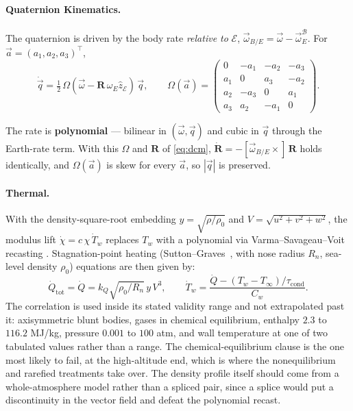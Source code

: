 \paragraph{Quaternion Kinematics.}
The quaternion is driven by the body rate \emph{relative to} $\mathcal E$,
$\vec\omega_{B/E} = \vec\omega - \vec\omega_E^{\mathcal B}$. For
$\vec a = (a_1, a_2, a_3)^\top$,
\begin{equation}
\label{eq:qkin}
\dot{\vec{q}} = \tfrac{1}{2}\,\Omega(\vec\omega
- \mathbf R\,\omega_E\hat z_{\mathcal E})\,\vec{q},
\qquad
\Omega(\vec a) = \begin{pmatrix}
0 & -a_1 & -a_2 & -a_3\\
a_1 & 0 & a_3 & -a_2 \\
a_2 & -a_3 & 0 & a_1 \\
a_3 & a_2 & -a_1 & 0
\end{pmatrix}.
\end{equation}

\begin{remark}
The rate is \textbf{polynomial} --- bilinear in $(\vec\omega, \vec q)$ and cubic
in $\vec q$ through the Earth-rate term. With this $\Omega$ and $\mathbf R$ of
\cref{eq:dcm}, $\dot{\mathbf R} = -[\vec\omega_{B/E}\times]\,\mathbf R$ holds
identically, and $\Omega(\vec a)$ is skew for every $\vec a$, so $|\vec q|$ is
preserved.
\end{remark}

\paragraph{Thermal.}
With the density-square-root embedding $y = \sqrt{\rho/\rho_0}$ and
$V = \sqrt{u^2+v^2+w^2}$, the modulus lift $\dot\chi = c\,\chi\,\dot T_w$
replaces $T_w$ with a polynomial via Varma--Savageau--Voit recasting
\parencite{savageau1987recasting}.
Stagnation-point heating (Sutton--Graves~\parencite{sutton1971general},
with nose radius $R_n$, sea-level density $\rho_0$) equations are then given by:
\begin{equation}
\label{eq:thermal}
\dot Q_{\mathrm{tot}} = \dot Q = k_Q\sqrt{\rho_0/R_n}\,y\,V^3,
\qquad
\dot T_w = \frac{\dot Q - (T_w - T_\infty)/\tau_\text{cond}}{C_w}.
\end{equation}
The correlation is used inside its stated validity range and not extrapolated
past it: axisymmetric blunt bodies, gases in chemical equilibrium, enthalpy
$2.3$ to $116.2$ MJ/kg, pressure $0.001$ to $100$ atm, and wall temperature at
one of two tabulated values rather than a range\parencite{sutton1971general,fay1958theory}.
The chemical-equilibrium clause is the one most likely to fail, at the
high-altitude end, which is where the nonequilibrium and rarefied treatments
take over\parencite{gnoffo1999planetary}.
The density profile itself should come from a whole-atmosphere model rather than
a spliced pair, since a splice would put a discontinuity in the vector field and
defeat the polynomial recast\parencite{emmert2021nrlmsis}.

